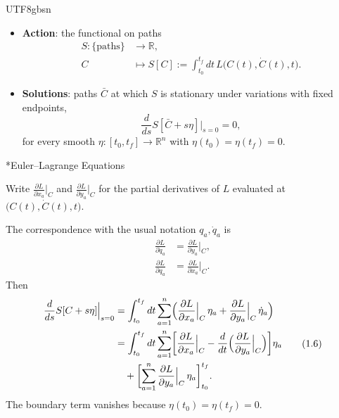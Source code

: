 \documentclass[11pt,a4paper,oneside]{report}
\makeatletter
\newcommand\topic{\@startsection{paragraph}{4}{\z@}{-1.7ex plus -.3ex}{.5ex}{\normalfont\normalsize\bfseries\itshape\boldmath}*}
\makeatother
\begin{document}
\begin{CJK*}{UTF8}{gbsn}
\begin{itemize}
\item \textbf{\boldmath Action}: the functional on paths
\begin{equation*}
{\displaystyle 
\begin{aligned}
S:\{\text{paths}\}&\to\mathbb R,\\
C&\mapsto S[C]:=\int_{t_0}^{t_f}dt\,L\bigl(C(t),\dot C(t),t\bigr).
\end{aligned}}
\tag{1.3}\label{eq:1.3}
\end{equation*}

\item \textbf{\boldmath Solutions}: paths $\bar C$ at which $S$ is stationary under variations with fixed endpoints,
\begin{equation*}
\frac{d}{ds}S[\bar C+s\eta]\Big|_{s=0}=0,
\tag{1.4}\label{eq:1.4}
\end{equation*}
for every smooth $\eta:[t_0,t_f]\to\mathbb R^n$ with $\eta(t_0)=\eta(t_f)=0$.
\end{itemize}


\topic{Euler–Lagrange Equations}

Write $\frac{\partial L}{\partial x_a}\big|_C$ and $\frac{\partial L}{\partial y_a}\big|_C$ for the partial derivatives of $L$ evaluated at $\bigl(C(t),\dot C(t),t\bigr)$.

The correspondence with the usual notation $q_a,\dot q_a$ is
\begin{equation*}
\begin{aligned}
\frac{\partial L}{\partial \dot q_a}&=\frac{\partial L}{\partial y_a}\Big|_C,\\
\frac{\partial L}{\partial q_a}&=\frac{\partial L}{\partial x_a}\Big|_C.
\end{aligned}
\tag{1.5}\label{eq:1.5}
\end{equation*}
Then
\begin{equation*}
\begin{aligned}
\frac{d}{ds}S[C+s\eta]\Big|_{s=0}
&=\int_{t_0}^{t_f}dt\sum_{a=1}^n\Bigl(\frac{\partial L}{\partial x_a}\Big|_C\,\eta_a+\frac{\partial L}{\partial y_a}\Big|_C\,\dot\eta_a\Bigr)\\
&=\int_{t_0}^{t_f}dt\sum_{a=1}^n\biggl[\frac{\partial L}{\partial x_a}\Big|_C-\frac{d}{dt}\Bigl(\frac{\partial L}{\partial y_a}\Big|_C\Bigr)\biggr]\eta_a\\
&\quad+\biggl[\sum_{a=1}^n\frac{\partial L}{\partial y_a}\Big|_C\,\eta_a\biggr]_{t_0}^{t_f}.
\end{aligned}
\tag{1.6}\label{eq:1.6}
\end{equation*}
The boundary term vanishes because $\eta(t_0)=\eta(t_f)=0$.


\end{CJK*}
\end{document}
